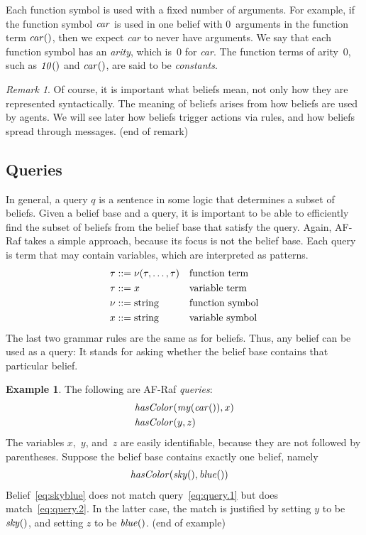 \documentclass[a4paper,12pt,oneside,fleqn]{book} %
\theoremstyle{plain}
\theoremstyle{definition}
\newtheorem{example}{Example}
\theoremstyle{remark}
\newtheorem{remark}{Remark}
\newcommand{\eox}[1]{\hskip5mm\null\nobreak\hfill#1}
\newcommand{\eoe}{\eox{(end of example)}}
\newcommand{\eor}{\eox{(end of remark)}}
\begin{document}
Each function symbol is used with a fixed number of arguments.  For
example, if the function symbol ${\it car}$ is used in one belief with
$0$~arguments in the function term ${\it car}()$, then we expect {\it
car\/} to never have arguments.  We say that each function symbol has an
\emph{arity}, which is~$0$ for {\it car}.  The function terms of arity~$0$,
such as ${\it 10}()$ and ${\it car}()$, are said to be \emph{constants}.

\begin{remark} Of course, it is important what beliefs mean, not only how
they are represented syntactically.  The meaning of beliefs arises from how
beliefs are used by agents.  We will see later how beliefs trigger actions
via rules, and how beliefs spread through messages.  \eor \end{remark}

\subsection{Queries}

In general, a query $q$ is a sentence in some logic that determines a
subset of beliefs.  Given a belief base and a query, it is important to be
able to efficiently find the subset of beliefs from the belief base that
satisfy the query.  Again, AF-Raf takes a simple approach, because its
focus is not the belief base.  Each query is term that may contain
variables, which are interpreted as patterns.  \begin{align} \tau &::=
\nu(\tau,\ldots,\tau) && \text{function term} \\ \tau &::= x &&
\text{variable term} \\ \nu  &::= {\rm string} &&\text{function symbol} \\
x &::= {\rm string} && \text{variable symbol} \end{align} The last two
grammar rules are the same as for beliefs.  Thus, any belief can be used as
a query:  It stands for asking whether the belief base contains that
particular belief.

\begin{example} The following are AF-Raf \emph{queries}: \begin{align}
&{\it hasColor}({\it my}({\it car}()), x) \label{eq:query.1} \\ &{\it
hasColor}(y, z) \label{eq:query.2} \end{align} The variables $x$,~$y$,
and~$z$ are easily identifiable, because they are not followed by
parentheses.  Suppose the belief base contains exactly one belief, namely
\begin{align} &{\it hasColor}({\it sky}(), {\it blue}()) \label{eq:skyblue}
\end{align} Belief~\eqref{eq:skyblue} does not match
query~\eqref{eq:query.1} but does match~\eqref{eq:query.2}.  In the latter
case, the match is justified by setting $y$ to be ${\it sky}()$, and
setting $z$ to be ${\it blue}()$.  \eoe \end{example}
\end{document}
